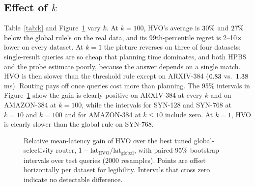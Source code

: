 \documentclass[sigconf,nonacm]{acmart}
\begin{document}
\subsection{Effect of $k$}\label{sec:eval_more}
Table~\ref{tab:k} and Figure~\ref{fig:gainci} vary $k$. At $k=100$, HVO's average is $30\%$ and $27\%$ below the global rule's on the real data, and its 99th-percentile regret is 2--10$\times$ lower on every dataset. At $k=1$ the picture reverses on three of four datasets: single-result queries are so cheap that planning time dominates, and both HPBS and the probe estimate poorly, because the answer depends on a single match. HVO is then slower than the threshold rule except on ARXIV-384 ($0.83$ vs.\ $1.38$\,ms). Routing pays off once queries cost more than planning. The 95\% intervals in Figure~\ref{fig:gainci} show the gain is clearly positive on ARXIV-384 at every $k$ and on AMAZON-384 at $k=100$, while the intervals for SYN-128 and SYN-768 at $k=10$ and $k=100$ and for AMAZON-384 at $k\le10$ include zero. At $k=1$, HVO is clearly slower than the global rule on SYN-768.

\begin{figure}[!t]
\centering
{}
\caption{Relative mean-latency gain of HVO over the best tuned global-selectivity router, $1-\overline{\text{lat}}_{\text{HVO}}/\overline{\text{lat}}_{\text{global}}$, with paired 95\% bootstrap intervals over test queries (2000 resamples). Points are offset horizontally per dataset for legibility. Intervals that cross zero indicate no detectable difference.}
\label{fig:gainci}
\end{figure}
\end{document}
